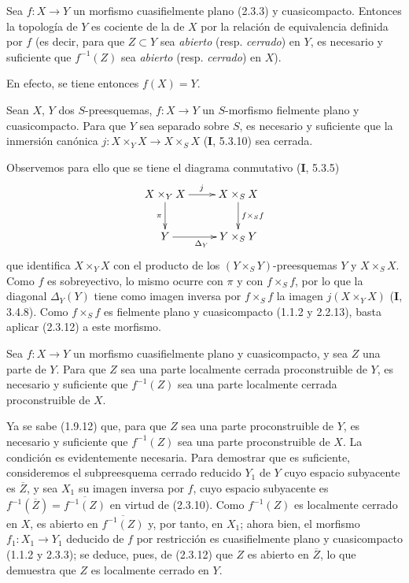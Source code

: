 \begin{corollary}[2.3.12]
\label{IV.2.3.12-fr}
Sea $f:X\to Y$ un morfismo cuasifielmente plano \textup{(2.3.3)} y cuasicompacto.
Entonces la topología de $Y$ es cociente de la de $X$ por la relación de
equivalencia definida por $f$ \textup{(es decir, para que $Z\subset Y$ sea \emph{abierto}
(resp. \emph{cerrado}) en $Y$, es necesario y suficiente que $f^{-1}(Z)$ sea \emph{abierto}
(resp. \emph{cerrado}) en $X$)}.
\end{corollary}

En efecto, se tiene entonces $f(X)=Y$.

\begin{corollary}[2.3.13]
\label{IV.2.3.13-fr}
Sean $X$, $Y$ dos $S$-preesquemas, $f:X\to Y$ un $S$-morfismo fielmente
plano y cuasicompacto. Para que $Y$ sea separado sobre $S$, es necesario y
suficiente que la inmersión canónica
$j:X\times_Y X\to X\times_S X$ \textup{(\textbf{I}, 5.3.10)} sea cerrada.
\end{corollary}

Observemos para ello que se tiene el diagrama conmutativo (\textbf I, 5.3.5)
\[
\xymatrix{
  X\times_Y X \ar[r]^j \ar[d]_{\pi} &
  X\times_S X \ar[d]^{f\times_S f}\\
  Y \ar[r]_{\Delta_Y} & Y\times_S Y
}
\]
que identifica $X\times_Y X$ con el producto de los
$(Y\times_S Y)$-preesquemas $Y$ y $X\times_S X$. Como $f$ es sobreyectivo,
lo mismo ocurre con $\pi$ y con $f\times_S f$, por lo que la diagonal
$\Delta_Y(Y)$ tiene como imagen inversa por $f\times_S f$ la imagen
$j(X\times_Y X)$ (\textbf I, 3.4.8). Como $f\times_S f$ es fielmente plano y
cuasicompacto (1.1.2 y 2.2.13), basta aplicar (2.3.12) a este morfismo.

\begin{corollary}[2.3.14]
\label{IV.2.3.14-fr}
Sea $f:X\to Y$ un morfismo cuasifielmente plano y cuasicompacto, y sea
$Z$ una parte de $Y$. Para que $Z$ sea una parte localmente cerrada
proconstruible de $Y$, es necesario y suficiente que $f^{-1}(Z)$ sea una
parte localmente cerrada proconstruible de $X$.
\end{corollary}

Ya se sabe (1.9.12) que, para que $Z$ sea una parte proconstruible de
$Y$, es necesario y suficiente que $f^{-1}(Z)$ sea una parte proconstruible
de $X$. La condición es evidentemente necesaria. Para demostrar que es
suficiente, consideremos el subpreesquema cerrado reducido $Y_1$ de $Y$ cuyo
espacio subyacente es $\overline Z$, y sea $X_1$ su imagen inversa por
$f$, cuyo espacio subyacente es
$f^{-1}(\overline Z)=\overline{f^{-1}(Z)}$ en virtud de (2.3.10). Como
$f^{-1}(Z)$ es localmente cerrado en $X$, es abierto en
$\overline{f^{-1}(Z)}$ y, por tanto, en $X_1$; ahora bien, el morfismo
$f_1:X_1\to Y_1$ deducido de $f$ por restricción es cuasifielmente plano y
cuasicompacto (1.1.2 y 2.3.3); se deduce, pues, de (2.3.12) que $Z$ es abierto
en $\overline Z$, lo que demuestra que $Z$ es localmente cerrado en $Y$.

